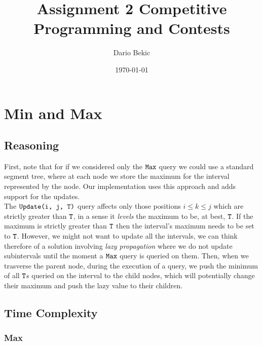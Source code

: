 \documentclass[a4paper,12pt]{article}
\title{Assignment 2 Competitive Programming and Contests}
\author{Dario Bekic}
\date{\today}
\begin{document}
\maketitle
\tableofcontents

\section{Min and Max}

\subsection{Reasoning}

First, note that for if we considered only the $\verb|Max|$ query we could use a standard segment tree, where at each node we store the maximum for the interval represented by the node. Our implementation uses this approach and adds support for the updates. \\
The $\verb|Update(i, j, T)|$ query affects only those positions $i\le k \le j$ which are strictly greater than $\verb|T|$, in a sense it \textit{levels} the maximum to be, at best, $\verb|T|$. 
If the maximum is strictly greater than $\verb|T|$ then the interval's maximum needs to be set to $\verb|T|$.
However, we might not want to update all the intervals, we can think therefore of a solution involving \textit{lazy propagation} where we do not update subintervals until the moment a $\verb|Max|$ query is queried on them. Then, when we trasverse the parent node, during the execution of a query, we push the minimum of all $\verb|T|$s queried on the interval to the child nodes, which will potentially change their maximum and push the lazy value to their children.\\

\subsection{Time Complexity}

\subsubsection{Max}
\end{document}
